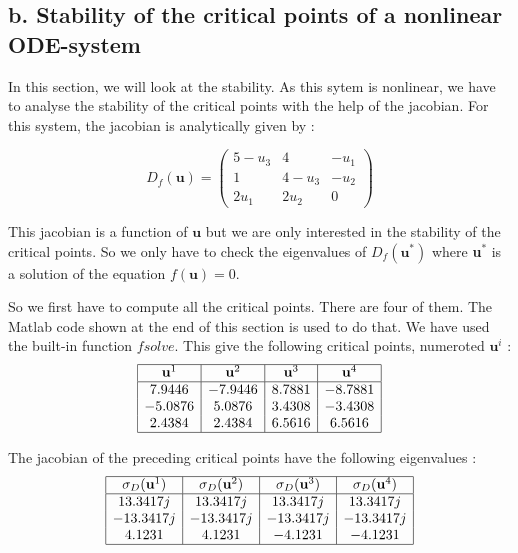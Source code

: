 \subsection*{b. Stability of the critical points of a nonlinear ODE-system}

In this section, we will look at the stability. As this sytem is nonlinear, we have to analyse the stability of the critical points with the help of the jacobian. For this system, the jacobian is analytically given by : 

$$D_f(\textbf{u}) = \left(\begin{array}{ccc}
5-u_3 & 4 & -u_1 \\ 
1 & 4-u_3 & -u_2 \\ 
2u_1 & 2u_2 & 0
\end{array} \right)$$

This jacobian is a function of $\textbf{u}$ but we are only interested in the stability of the critical points. So we only have to check the eigenvalues of $D_f(\textbf{u}^*)$ where \textbf{u$^*$} is a solution of the equation $f(\textbf{u})=0$.

So we first have to compute all the critical points. There are four of them. The Matlab code shown at the end of this section is used to do that. We have used the built-in function $fsolve$. This give the following critical points, numeroted $\textbf{u}^i$ : 
$$\begin{array}{|c|c|c|c|}
\hline
\textbf{u}^1 & \textbf{u}^2 & \textbf{u}^3 & \textbf{u}^4 \\ 
\hline
7.9446 & -7.9446 & 8.7881 & -8.7881 \\ 
-5.0876 & 5.0876 & 3.4308 & -3.4308 \\ 
2.4384 & 2.4384 & 6.5616 & 6.5616\\
\hline
\end{array} $$

The jacobian of the preceding critical points have the following eigenvalues : 
$$\begin{array}{|c|c|c|c|}
\hline
\sigma_D(\textbf{u}^1) & \sigma_D(\textbf{u}^2) & \sigma_D(\textbf{u}^3) & \sigma_D(\textbf{u}^4) \\ 
\hline
13.3417j & 13.3417j & 13.3417j & 13.3417j \\ 
-13.3417j & -13.3417j & -13.3417j & -13.3417j \\ 
4.1231 & 4.1231 & -4.1231 & -4.1231\\
\hline
\end{array} $$


